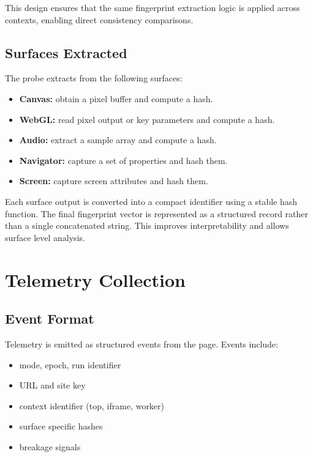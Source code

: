 \documentclass[11pt]{report}
\begin{document}
This design ensures that the same fingerprint extraction logic is applied across contexts, enabling direct consistency comparisons.

\subsection{Surfaces Extracted}

The probe extracts from the following surfaces:

\begin{itemize}
    \item \textbf{Canvas:} obtain a pixel buffer and compute a hash.
    \item \textbf{WebGL:} read pixel output or key parameters and compute a hash.
    \item \textbf{Audio:} extract a sample array and compute a hash.
    \item \textbf{Navigator:} capture a set of properties and hash them.
    \item \textbf{Screen:} capture screen attributes and hash them.
\end{itemize}

Each surface output is converted into a compact identifier using a stable hash function. The final fingerprint vector is represented as a structured record rather than a single concatenated string. This improves interpretability and allows surface level analysis.

\section{Telemetry Collection}

\subsection{Event Format}

Telemetry is emitted as structured events from the page. Events include:

\begin{itemize}
    \item mode, epoch, run identifier
    \item URL and site key
    \item context identifier (top, iframe, worker)
    \item surface specific hashes
    \item breakage signals
\end{itemize}
\end{document}
